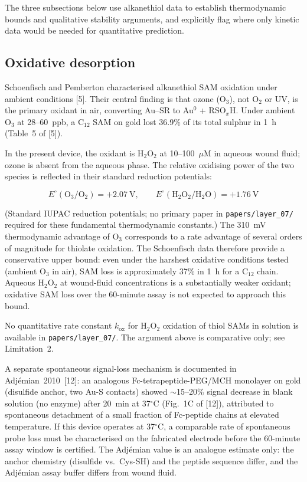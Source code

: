 \documentclass[10pt,a4paper]{article}
\numberwithin{equation}{section}
\newcommand{\cit}[1]{[#1]}   %
\begin{document}
The three subsections below use alkanethiol data to establish thermodynamic bounds and
qualitative stability arguments, and explicitly flag where only kinetic data would be
needed for quantitative prediction.

\subsection{Oxidative desorption}

Schoenfisch and Pemberton characterised alkanethiol SAM oxidation under ambient conditions
\cit{5}. Their central finding is that ozone (O$_3$), not O$_2$ or UV, is the primary
oxidant in air, converting Au--SR to Au$^0$ + RSO$_x$H. Under ambient O$_3$ at 28--60~ppb,
a C$_{12}$ SAM on gold lost 36.9\% of its total sulphur in 1~h (Table~5 of \cit{5}).

In the present device, the oxidant is H$_2$O$_2$ at 10--100~$\mu$M in aqueous wound fluid;
ozone is absent from the aqueous phase. The relative oxidising power of the two species
is reflected in their standard reduction potentials:

\begin{equation}
  E^\circ(\text{O}_3/\text{O}_2) = +2.07\ \text{V},
  \qquad
  E^\circ(\text{H}_2\text{O}_2/\text{H}_2\text{O}) = +1.76\ \text{V}
  \label{eq:redox}
\end{equation}

(Standard IUPAC reduction potentials; no primary paper in \texttt{papers/layer\_07/}
required for these fundamental thermodynamic constants.)
The 310~mV thermodynamic advantage of O$_3$ corresponds to a rate advantage of several
orders of magnitude for thiolate oxidation. The Schoenfisch data therefore provide a
conservative upper bound: even under the harshest oxidative conditions tested (ambient O$_3$
in air), SAM loss is approximately 37\% in 1~h for a C$_{12}$ chain. Aqueous H$_2$O$_2$
at wound-fluid concentrations is a substantially weaker oxidant; oxidative SAM loss over
the 60-minute assay is not expected to approach this bound.

No quantitative rate constant $k_{\mathrm{ox}}$ for H$_2$O$_2$ oxidation of thiol SAMs
in solution is available in \texttt{papers/layer\_07/}. The argument above is comparative
only; see Limitation~2.

A separate spontaneous signal-loss mechanism is documented in Adj\'{e}mian~2010~\cit{12}:
an analogous Fc-tetrapeptide-PEG/MCH monolayer on gold (disulfide anchor, two Au-S
contacts) showed $\sim$15--20\% signal decrease in blank solution (no enzyme) after
20~min at 37$^\circ$C (Fig.~1C of \cit{12}), attributed to spontaneous detachment of a
small fraction of Fc-peptide chains at elevated temperature. If this device operates at
37$^\circ$C, a comparable rate of spontaneous probe loss must be characterised on the
fabricated electrode before the 60-minute assay window is certified. The Adj\'{e}mian
value is an analogue estimate only: the anchor chemistry (disulfide vs.\ Cys-SH) and
the peptide sequence differ, and the Adj\'{e}mian assay buffer differs from wound fluid.
\end{document}
